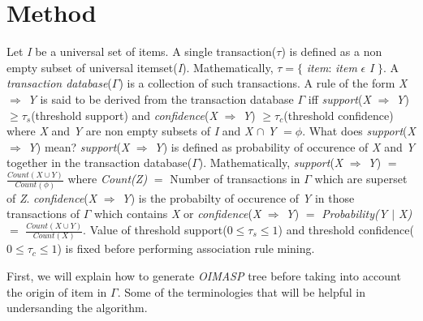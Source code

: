 \documentclass[review]{elsarticle}
\begin{document}
\section{Method}
Let \emph{I} be a universal set of items. A single transaction($\tau$) is defined as a non empty subset of universal itemset(\emph{I}). Mathematically, $ \tau = \lbrace $ \textit{item}: \textit{item} $ \epsilon $ \emph{I} $\rbrace$. A \textit{transaction database}($ \Gamma $) is a collection of such transactions. A rule of the form \emph{X} $ \Rightarrow $ \emph{Y} is said to be derived from the transaction database $ \Gamma $ iff \emph{support}(\emph{X} $ \Rightarrow $ \emph{Y}) $ \geq \tau _{s} $(threshold support) and \emph{confidence}(\emph{X} $ \Rightarrow $ \emph{Y}) $ \geq \tau _{c} $(threshold confidence) where \emph{X} and \emph{Y} are non empty subsets of \emph{I} and \emph{X} $ \cap $ \emph{Y} $ =\phi $. What does \emph{support}(\emph{X} $ \Rightarrow $ \emph{Y}) mean? \emph{support}(\emph{X} $ \Rightarrow $ \emph{Y})  is defined as probability of occurence of \emph{X} and \emph{Y} together in the transaction database($ \Gamma $). Mathematically, \emph{support}(\emph{X} $ \Rightarrow $ \emph{Y}) $ = $ $ \frac{Count(X \cup Y)}{Count(\phi)} $ where \emph{Count(Z)} $ = $ Number of transactions in $ \Gamma $ which are superset of \emph{Z}. \emph{confidence}(\emph{X} $ \Rightarrow $ \emph{Y}) is the probabilty of occurence of \emph{Y} in those transactions of $ \Gamma $ which contains \emph{X} or \emph{confidence}(\emph{X} $ \Rightarrow $ \emph{Y}) $ = $ \emph{Probability(Y $ \vert $ X)} $ = $ $ \frac{Count(X \cup Y)}{Count(X)} $. Value of threshold support($ 0 \leq \tau _{s} \leq 1 $) and threshold confidence($ 0 \leq \tau _{c} \leq 1 $) is fixed before performing association rule mining.

First, we will explain how to generate \emph{OIMASP} tree before taking into account the origin of item in $ \Gamma $. Some of the terminologies that will be helpful in undersanding the algorithm.
\end{document}

